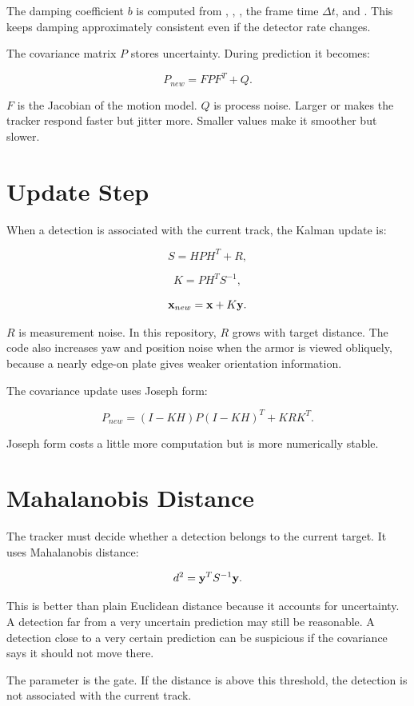The damping coefficient $b$ is computed from ,
, , the frame time $\Delta t$, and
. This keeps damping approximately consistent even if the
detector rate changes.

The covariance matrix $P$ stores uncertainty. During prediction it becomes:

\[
P_{new} = FPF^T + Q.
\]

$F$ is the Jacobian of the motion model. $Q$ is process noise. Larger
 or  makes the tracker respond faster but jitter
more. Smaller values make it smoother but slower.

\section{Update Step}

When a detection is associated with the current track, the Kalman update is:

\[
S = HPH^T + R,
\]

\[
K = PH^T S^{-1},
\]

\[
\mathbf{x}_{new} = \mathbf{x} + K\mathbf{y}.
\]

$R$ is measurement noise. In this repository, $R$ grows with target distance.
The code also increases yaw and position noise when the armor is viewed
obliquely, because a nearly edge-on plate gives weaker orientation information.

The covariance update uses Joseph form:

\[
P_{new} = (I-KH)P(I-KH)^T + KRK^T.
\]

Joseph form costs a little more computation but is more numerically stable.

\section{Mahalanobis Distance}

The tracker must decide whether a detection belongs to the current target.
It uses Mahalanobis distance:

\[
d^2 = \mathbf{y}^T S^{-1} \mathbf{y}.
\]

This is better than plain Euclidean distance because it accounts for
uncertainty. A detection far from a very uncertain prediction may still be
reasonable. A detection close to a very certain prediction can be suspicious if
the covariance says it should not move there.

The parameter  is the gate. If the distance is above
this threshold, the detection is not associated with the current track.

